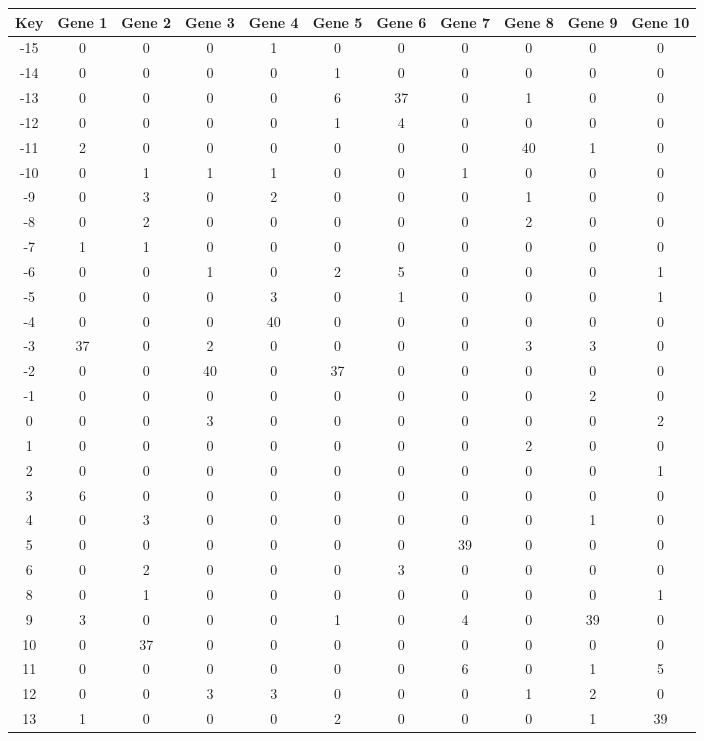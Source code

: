 \begin{tabular}{|c|c|c|c|c|c|c|c|c|c|c|}
\hline
Key & Gene 1 & Gene 2 & Gene 3 & Gene 4 & Gene 5 & Gene 6 & Gene 7 & Gene 8 & Gene 9 & Gene 10 \\
\hline
-15 & 0 & 0 & 0 & 1 & 0 & 0 & 0 & 0 & 0 & 0 \\
-14 & 0 & 0 & 0 & 0 & 1 & 0 & 0 & 0 & 0 & 0 \\
-13 & 0 & 0 & 0 & 0 & 6 & 37 & 0 & 1 & 0 & 0 \\
-12 & 0 & 0 & 0 & 0 & 1 & 4 & 0 & 0 & 0 & 0 \\
-11 & 2 & 0 & 0 & 0 & 0 & 0 & 0 & 40 & 1 & 0 \\
-10 & 0 & 1 & 1 & 1 & 0 & 0 & 1 & 0 & 0 & 0 \\
-9 & 0 & 3 & 0 & 2 & 0 & 0 & 0 & 1 & 0 & 0 \\
-8 & 0 & 2 & 0 & 0 & 0 & 0 & 0 & 2 & 0 & 0 \\
-7 & 1 & 1 & 0 & 0 & 0 & 0 & 0 & 0 & 0 & 0 \\
-6 & 0 & 0 & 1 & 0 & 2 & 5 & 0 & 0 & 0 & 1 \\
-5 & 0 & 0 & 0 & 3 & 0 & 1 & 0 & 0 & 0 & 1 \\
-4 & 0 & 0 & 0 & 40 & 0 & 0 & 0 & 0 & 0 & 0 \\
-3 & 37 & 0 & 2 & 0 & 0 & 0 & 0 & 3 & 3 & 0 \\
-2 & 0 & 0 & 40 & 0 & 37 & 0 & 0 & 0 & 0 & 0 \\
-1 & 0 & 0 & 0 & 0 & 0 & 0 & 0 & 0 & 2 & 0 \\
0 & 0 & 0 & 3 & 0 & 0 & 0 & 0 & 0 & 0 & 2 \\
1 & 0 & 0 & 0 & 0 & 0 & 0 & 0 & 2 & 0 & 0 \\
2 & 0 & 0 & 0 & 0 & 0 & 0 & 0 & 0 & 0 & 1 \\
3 & 6 & 0 & 0 & 0 & 0 & 0 & 0 & 0 & 0 & 0 \\
4 & 0 & 3 & 0 & 0 & 0 & 0 & 0 & 0 & 1 & 0 \\
5 & 0 & 0 & 0 & 0 & 0 & 0 & 39 & 0 & 0 & 0 \\
6 & 0 & 2 & 0 & 0 & 0 & 3 & 0 & 0 & 0 & 0 \\
8 & 0 & 1 & 0 & 0 & 0 & 0 & 0 & 0 & 0 & 1 \\
9 & 3 & 0 & 0 & 0 & 1 & 0 & 4 & 0 & 39 & 0 \\
10 & 0 & 37 & 0 & 0 & 0 & 0 & 0 & 0 & 0 & 0 \\
11 & 0 & 0 & 0 & 0 & 0 & 0 & 6 & 0 & 1 & 5 \\
12 & 0 & 0 & 3 & 3 & 0 & 0 & 0 & 1 & 2 & 0 \\
13 & 1 & 0 & 0 & 0 & 2 & 0 & 0 & 0 & 1 & 39 \\
\hline
\end{tabular}